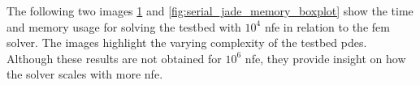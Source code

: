 \documentclass[./\jobname.tex]{subfiles}
\begin{document}
The following two images \ref{fig:serial_jade_time_boxplot} and \ref{fig:serial_jade_memory_boxplot} show the time and memory usage for solving the testbed with $10^4$ \gls{nfe} in relation to the \gls{fem} solver. The images highlight the varying complexity of the testbed \gls{pde}s. Although these results are not obtained for $10^6$ \gls{nfe}, they provide insight on how the solver scales with more \gls{nfe}. 
\begin{figure}[h]
	\centering
	\noindent{}
	\label{fig:serial_jade_time_boxplot}
\end{figure}
\end{document}
